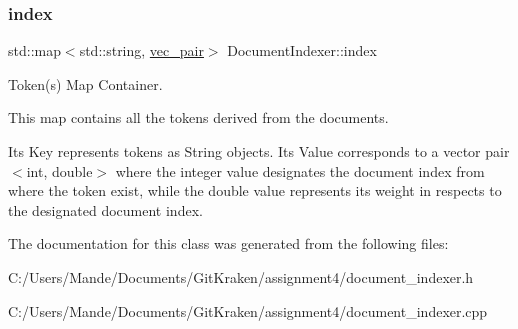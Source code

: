 \subsubsection{\texorpdfstring{index}{index}}
{\footnotesize\ttfamily std\+::map$<$std\+::string, \hyperlink{class_document_indexer_a8a84f5e40d9364c31e81627270142628}{vec\+\_\+pair}$>$ Document\+Indexer\+::index\hspace{0.3cm}{\ttfamily [private]}}



Token(s) Map Container. 

This map contains all the tokens derived from the documents.

It\textquotesingle{}s Key represents tokens as String objects. It\textquotesingle{}s Value corresponds to a vector pair $<$int, double$>$ where the integer value designates the document index from where the token exist, while the double value represents its weight in respects to the designated document index. 

The documentation for this class was generated from the following files\+:\begin{DoxyCompactItemize}
\item 
C\+:/\+Users/\+Mande/\+Documents/\+Git\+Kraken/assignment4/document\+\_\+indexer.\+h\item 
C\+:/\+Users/\+Mande/\+Documents/\+Git\+Kraken/assignment4/document\+\_\+indexer.\+cpp\end{DoxyCompactItemize}

